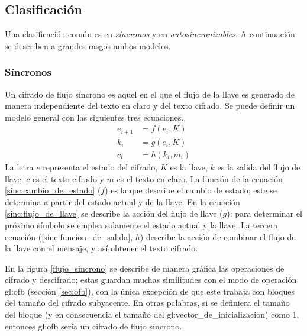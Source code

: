 %
%

\subsection{Clasificación}

Una clasificación común es en \textit{síncronos} y
en \textit{autosincronizables}. A continuación se describen a grandes rasgos
ambos modelos.

\subsubsection{Síncronos}

Un cifrado de flujo síncrono es aquel en el que el flujo de la llave es
generado de manera independiente del texto en claro y del texto cifrado. Se
puede definir un modelo general con las siguientes tres ecuaciones.
\begin{align}
  \label{sinc:cambio_de_estado}
  e_{i+1} &= f(e_i, K) \\
  \label{sinc:flujo_de_llave}
  k_i &= g(e_i, K) \\
  \label{sinc:funcion_de_salida}
  c_i &= h(k_i, m_i)
\end{align}
La letra $ e $ representa el estado del cifrado, $ K $ es la llave, $ k $ es
la salida del flujo de llave, $ c $ es el texto cifrado y $ m $ es el texto en
claro. La función de la ecuación \ref{sinc:cambio_de_estado} ($ f $) es la que
describe el cambio de estado; este se determina a partir del estado actual y
de la llave. En la ecuación \ref{sinc:flujo_de_llave} se describe la acción del
flujo de llave ($ g $): para determinar el próximo símbolo se emplea solamente
el estado actual y la llave. La tercera ecuación (\ref{sinc:funcion_de_salida},
$ h $) describe la acción de combinar el flujo de la llave con el mensaje, y
así obtener el texto cifrado.

En la figura \ref{flujo_sincrono} se describe de manera gráfica las operaciones
de cifrado y descifrado; estas guardan muchas similitudes con el modo de
operación \gls{gl:ofb} (sección \ref{sec:ofb}), con la única excepción de
que este trabaja con bloques del tamaño del cifrado subyacente. En otras
palabras, si se definiera el tamaño del bloque (y en consecuencia el tamaño del
\gls{gl:vector_de_inicializacion}) como 1, entonces \gls{gl:ofb} sería un
cifrado de flujo síncrono.

